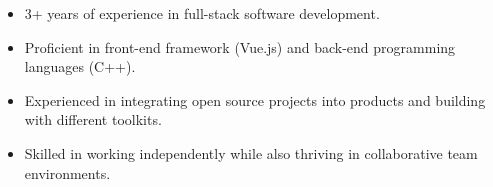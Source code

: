 

\begin{cvparagraph}
\vspace{0.3em}
\begin{itemize}
    \item 3+ years of experience in full-stack software development.
    \item Proficient in front-end framework (Vue.js) and back-end programming languages (C++).
    \item Experienced in integrating open source projects into products and building with different toolkits.
    \item Skilled in working independently while also thriving in collaborative team environments.
\end{itemize}
\end{cvparagraph}

